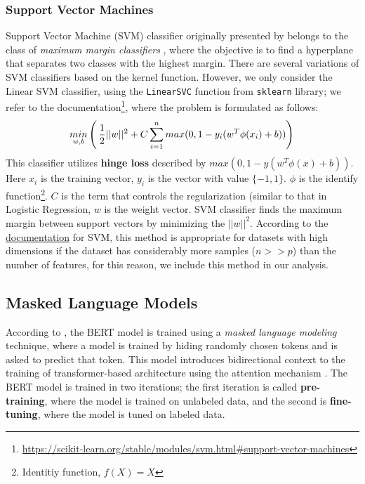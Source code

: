 \documentclass[11pt]{article}
\begin{document}
\subsubsection{Support Vector Machines}
Support Vector Machine (SVM) classifier originally presented by \cite{vapnik} belongs to the class of \textit{maximum margin classifiers} \cite{bishop}, where the objective is to find a hyperplane that separates two classes with the highest margin. There are several variations of SVM classifiers based on the kernel function. However, we only consider the Linear SVM classifier, using the \texttt{LinearSVC} function from \texttt{sklearn} library; we refer to the documentation\footnote{\url{https://scikit-learn.org/stable/modules/svm.html\#support-vector-machines}}, where the problem is formulated as follows:
\begin{equation}
\small
   \underset{w,b}{min} \left(\, \frac{1}{2}||w||^2 + C \sum_{i=1}^n max(0,1-y_i(w^T\phi(x_i)+b))\right)\\
\end{equation}
This classifier utilizes \textbf{hinge loss} described by $max(0,1-y(w^T \phi(x)+b))$. Here $x_i$ is the training vector, $y_i$ is the vector with value $\{-1,1\}$. $\phi$ is the identify function\footnote{Identitiy function, $f(X)=X$}. $C$ is the term that controls the regularization (similar to that in Logistic Regression, $w$ is the weight vector. SVM classifier finds the maximum margin between support vectors by minimizing the $||w||^2$. According to the \href{https://scikit-learn.org/stable/modules/svm.html#support-vector-machines}{documentation} for SVM, this method is appropriate for datasets with high dimensions if the dataset has considerably more samples ($n>>p$) than the number of features, for this reason, we include this method in our analysis.

\subsection{Masked Language Models}
According to \cite{BERT}, the BERT model is trained using a \textit{masked language modeling} technique, where a model is trained by hiding randomly chosen tokens and is asked to predict that token. This model introduces bidirectional context to the training of transformer-based architecture using the attention mechanism \cite{attention}. The BERT model is trained in two iterations; the first iteration is called \textbf{pre-training}, where the model is trained on unlabeled data, and the second is \textbf{fine-tuning}, where the model is tuned on labeled data. 
\end{document}
